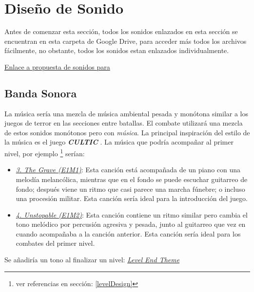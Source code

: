 {
            }

\newpage

\section{Diseño de Sonido}
    Antes de comenzar esta sección, todos los sonidos enlazados en esta sección se encuentran en esta carpeta de Google Drive, para acceder más todos los archivos fácilmente, no obstante, todos los sonidos estan enlazados individualmente.
        \begin{center}
            \href{https://drive.google.com/open?id=13Drehn-OJeRZ-eS3PpO_D1z_Fl79qpGu&usp=drive_fs}{Enlace a propuesta de sonidos para \gameTitle}
        \end{center}
    \subsection{Banda Sonora} \label{ost}
        La música sería una mezcla de música ambiental pesada y monótona similar a los juegos de terror en las secciones entre batallas. El combate utilizará una mezcla de estos sonidos monótonos pero con \textit{música}. La principal inspiración del estilo de la música es el juego \textbf{\textit{CULTIC}} \cite{cultic2022} \cite{jasozz_cultic_2023}. La música que podría acompañar al primer nivel, por ejemplo \footnote{ver referencias en sección: \ref{levelDesign}} serían:
            \begin{itemize}
                \item \href{https://youtu.be/LXxBT9cmWjI?si=1Fgiadgp8nBzD8x4&t=245}{\textit{3. The Grave (E1M1)}}: Esta canción está acompañada de un piano con una melodía melancólica, mientras que en el fondo se puede escuchar guitarreo de fondo; después viene un ritmo que casi parece una marcha fúnebre; o incluso una procesión militar. Esta canción sería ideal para la introducción del juego.
                \item \href{https://youtu.be/LXxBT9cmWjI?si=d9kko76w1qNqges7&t=469}{\textit{4. Unstopable (E1M2)}}: Esta canción contiene un ritmo similar pero cambia el tono melódico por percusión agresiva y pesada, junto al guitarreo que vez en cuando acompañaba a la canción anterior. Esta canción sería ideal para los combates del primer nivel.
            \end{itemize}
        Se añadiría un tono al finalizar un nivel: \href{https://www.youtube.com/watch?v=LXxBT9cmWjI&t=4407s}{\textit{Level End Theme}}

